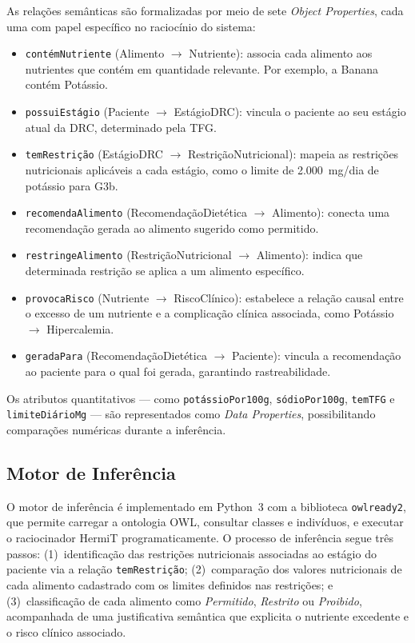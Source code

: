 \documentclass[12pt, a4paper, twocolumn]{article}
\begin{document}
As relações semânticas são formalizadas por meio de sete \textit{Object Properties}, cada uma com papel específico no raciocínio do sistema:

\begin{itemize}
    \item \texttt{contémNutriente} (Alimento $\rightarrow$ Nutriente): associa cada alimento aos nutrientes que contém em quantidade relevante. Por exemplo, a Banana contém Potássio.
    \item \texttt{possuiEstágio} (Paciente $\rightarrow$ EstágioDRC): vincula o paciente ao seu estágio atual da DRC, determinado pela TFG.
    \item \texttt{temRestrição} (EstágioDRC $\rightarrow$ RestriçãoNutricional): mapeia as restrições nutricionais aplicáveis a cada estágio, como o limite de 2.000~mg/dia de potássio para G3b.
    \item \texttt{recomendaAlimento} (RecomendaçãoDietética $\rightarrow$ Alimento): conecta uma recomendação gerada ao alimento sugerido como permitido.
    \item \texttt{restringeAlimento} (RestriçãoNutricional $\rightarrow$ Alimento): indica que determinada restrição se aplica a um alimento específico.
    \item \texttt{provocaRisco} (Nutriente $\rightarrow$ RiscoClínico): estabelece a relação causal entre o excesso de um nutriente e a complicação clínica associada, como Potássio $\rightarrow$ Hipercalemia.
    \item \texttt{geradaPara} (RecomendaçãoDietética $\rightarrow$ Paciente): vincula a recomendação ao paciente para o qual foi gerada, garantindo rastreabilidade.
\end{itemize}

Os atributos quantitativos --- como \texttt{potássioPor100g}, \texttt{sódioPor100g}, \texttt{temTFG} e \texttt{limiteDiárioMg} --- são representados como \textit{Data Properties}, possibilitando comparações numéricas durante a inferência.

    \subsection{Motor de Inferência}

O motor de inferência é implementado em Python~3 com a biblioteca \texttt{owlready2}, que permite carregar a ontologia OWL, consultar classes e indivíduos, e executar o raciocinador HermiT programaticamente. O processo de inferência segue três passos: (1)~identificação das restrições nutricionais associadas ao estágio do paciente via a relação \texttt{temRestrição}; (2)~comparação dos valores nutricionais de cada alimento cadastrado com os limites definidos nas restrições; e (3)~classificação de cada alimento como \textit{Permitido}, \textit{Restrito} ou \textit{Proibido}, acompanhada de uma justificativa semântica que explicita o nutriente excedente e o risco clínico associado.
\end{document}
